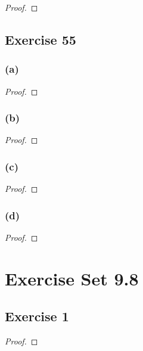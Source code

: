 \documentclass[14pt]{extarticle}
\begin{document}
\begin{proof}

\end{proof}

\subsection{Exercise 55}

\subsubsection{(a)}

\begin{proof}

\end{proof}

\subsubsection{(b)}

\begin{proof}

\end{proof}

\subsubsection{(c)}

\begin{proof}

\end{proof}

\subsubsection{(d)}

\begin{proof}

\end{proof}

\section{Exercise Set 9.8}

\subsection{Exercise 1}

\begin{proof}

\end{proof}
\end{document}
